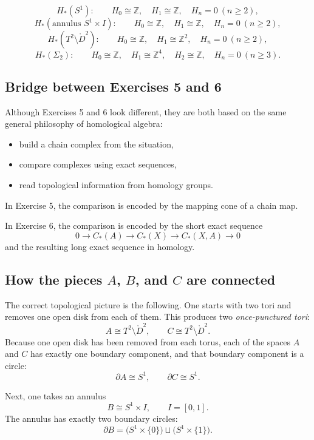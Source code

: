 \documentclass[12pt,a4paper]{article}
\theoremstyle{notespace}
\begin{document}
\[
H_*(S^1):
\qquad
H_0\cong \mathbb Z,\quad H_1\cong \mathbb Z,\quad H_n=0 \ (n\ge 2),
\]
\[
H_*(\text{annulus }S^1\times I):
\qquad
H_0\cong \mathbb Z,\quad H_1\cong \mathbb Z,\quad H_n=0 \ (n\ge 2),
\]
\[
H_*(T^2\setminus \mathring{D}^2):
\qquad
H_0\cong \mathbb Z,\quad H_1\cong \mathbb Z^2,\quad H_n=0 \ (n\ge 2),
\]
\[
H_*(\Sigma_2):
\qquad
H_0\cong \mathbb Z,\quad H_1\cong \mathbb Z^4,\quad H_2\cong \mathbb Z,\quad H_n=0 \ (n\ge 3).
\]

\subsection{Bridge between Exercises 5 and 6}

Although Exercises 5 and 6 look different, they are both based on the same general philosophy of homological algebra:

\begin{itemize}
	\item build a chain complex from the situation,
	\item compare complexes using exact sequences,
	\item read topological information from homology groups.
\end{itemize}

In Exercise 5, the comparison is encoded by the mapping cone of a chain map.

In Exercise 6, the comparison is encoded by the short exact sequence
\[
0\to C_*(A)\to C_*(X)\to C_*(X,A)\to 0
\]
and the resulting long exact sequence in homology.

\subsection{How the pieces \(A\), \(B\), and \(C\) are connected}

The correct topological picture is the following. One starts with two tori and removes one open disk from each of them. This produces two \emph{once-punctured tori}:
\[
A \cong T^2 \setminus \mathring{D}^2,
\qquad
C \cong T^2 \setminus \mathring{D}^2.
\]
Because one open disk has been removed from each torus, each of the spaces \(A\) and \(C\) has exactly one boundary component, and that boundary component is a circle:
\[
\partial A \cong S^1,
\qquad
\partial C \cong S^1.
\]

Next, one takes an annulus
\[
B \cong S^1 \times I,
\qquad I=[0,1].
\]
The annulus has exactly two boundary circles:
\[
\partial B
=
\bigl(S^1\times\{0\}\bigr)\sqcup \bigl(S^1\times\{1\}\bigr).
\]
\end{document}
